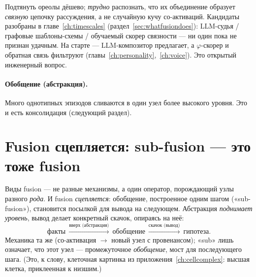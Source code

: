 \begin{openq}
Подтянуть ореолы дёшево; \emph{трудно} распознать, что их объединение образует
\emph{связную} цепочку рассуждения, а не случайную кучу со-активаций. Кандидаты
разобраны в главе~\ref{ch:timescales} (раздел~\ref{sec:whatfusiondoes}): LLM-судья /
графовые шаблоны-схемы / обучаемый скорер связности — ни один пока не признан
удачным. На старте — LLM-композитор предлагает, а $\varphi$-скорер и обратная связь
фильтруют (главы~\ref{ch:personality},~\ref{ch:voice}). Это открытый инженерный
вопрос.
\end{openq}

\paragraph{Обобщение (абстракция).} Много однотипных эпизодов сливаются в один узел
более высокого уровня. Это и есть консолидация (следующий раздел).

\section{Fusion сцепляется: sub-fusion — это тоже fusion}

Виды fusion — не разные механизмы, а один оператор, порождающий узлы разного
\emph{рода}. И fusion \emph{сцепляется}: обобщение, построенное одним шагом
(«sub-fusion»), становится посылкой для вывода на следующем. Абстракция
\emph{поднимает уровень}, вывод делает конкретный скачок, опираясь на неё:
\[
\text{факты}\ \xrightarrow{\text{вверх (абстракция)}}\ \text{обобщение}\
\xrightarrow{\text{скачок (вывод)}}\ \text{гипотеза}.
\]
Механика та же (со-активация $\to$ новый узел с провенансом); «sub» лишь означает,
что этот узел — промежуточное \emph{обобщение}, мост для последующего шага. (Это, к
слову, клеточная картинка из приложения~\ref{ch:cellcomplex}: высшая клетка,
приклеенная к низшим.)

